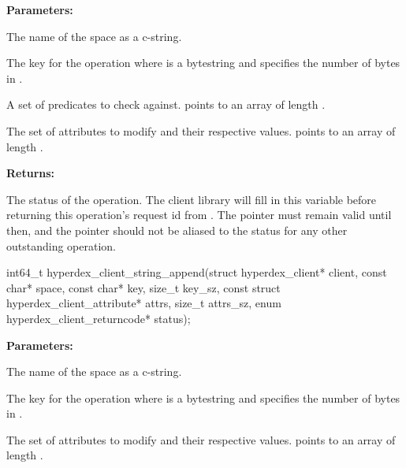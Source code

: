 \noindent\textbf{Parameters:}
\begin{description}[labelindent=\widthof{{\code{checks}, \code{checks\_sz}}},leftmargin=*,noitemsep,nolistsep,align=right]
\item[\code{space}] The name of the space as a c-string.
\item[\code{key}, \code{key\_sz}] The key for the operation where  is a bytestring and  specifies the number of bytes in .
\item[\code{checks}, \code{checks\_sz}] A set of predicates to check against.   points to an array of length .
\item[\code{attrs}, \code{attrs\_sz}] The set of attributes to modify and their respective values.   points to an array of length .
\end{description}

\noindent\textbf{Returns:}
\begin{description}[labelindent=\widthof{{\code{status}}},leftmargin=*,noitemsep,nolistsep,align=right]
\item[\code{status}] The status of the operation.  The client library will fill in this variable before returning this operation's request id from .  The pointer must remain valid until then, and the pointer should not be aliased to the status for any other outstanding operation.
\end{description}

\funcsep
{}
\begin{ccode}
int64_t hyperdex_client_string_append(struct hyperdex_client* client,
                const char* space,
                const char* key, size_t key_sz,
                const struct hyperdex_client_attribute* attrs, size_t attrs_sz,
                enum hyperdex_client_returncode* status);
\end{ccode}
\funcdesc 

\noindent\textbf{Parameters:}
\begin{description}[labelindent=\widthof{{\code{attrs}, \code{attrs\_sz}}},leftmargin=*,noitemsep,nolistsep,align=right]
\item[\code{space}] The name of the space as a c-string.
\item[\code{key}, \code{key\_sz}] The key for the operation where  is a bytestring and  specifies the number of bytes in .
\item[\code{attrs}, \code{attrs\_sz}] The set of attributes to modify and their respective values.   points to an array of length .
\end{description}

